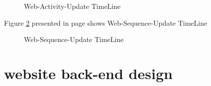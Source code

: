 \documentclass[12pt,a4paper,class,twoside,openany]{report}
\begin{document}
{\begin{figure}
\begin{center}
{}
\caption{Web-Activity-Update TimeLine}
\label{fg:4-9}
\end{center}
\end{figure}
Figure \ref{fg:4-10} presented in page \pageref{fg:4-10} shows Web-Sequence-Update TimeLine
\begin{figure}
\begin{center}
\caption{Web-Sequence-Update TimeLine}
\label{fg:4-10}
\end{center}
\end{figure}
\section{website back-end design}
}
\end{document}
